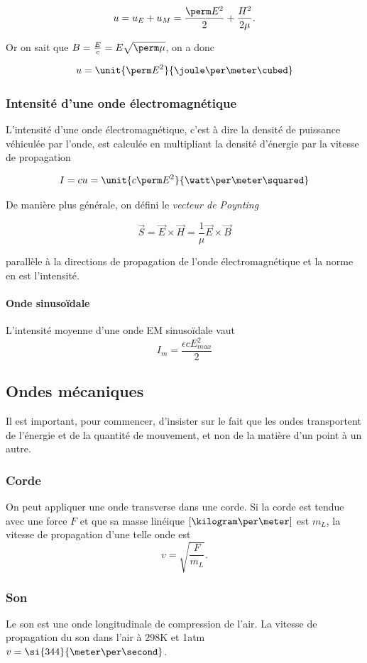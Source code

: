$$u = u_E + u_M = \frac{\perm E^2}{2} + \frac{H^2}{2\mu}.$$

Or on sait que $B = \frac{E}{c} = E\sqrt{\perm\mu}$, on a donc

$$u = \unit{\perm E^2}{\joule\per\meter\cubed}$$

\subsubsection{Intensité d'une onde électromagnétique}
L'intensité d'une onde électromagnétique, c'est à
dire la densité de puissance véhiculée par l'onde, est calculée
en multipliant la densité d'énergie par la vitesse de propagation

$$I = cu = \unit{c\perm E^2}{\watt\per\meter\squared}$$

De manière plus générale, on défini le \emph{vecteur de Poynting}

\[\vec{S} = \vec{E} \times \vec{H} = \frac{1}{\mu} \vec{E} \times \vec{B}\]

parallèle à la directions de propagation de l'onde électromagnétique
et la norme en est l'intensité.

\paragraph{Onde sinusoïdale} L'intensité moyenne d'une onde EM sinusoïdale vaut
\[I_m = \frac{\epsilon c E^2_{max}}{2}\]

\subsection{Ondes mécaniques}
Il est important, pour commencer, d'insister sur le fait
que les ondes transportent de l'énergie et de la quantité de mouvement,
et non de la matière d'un point à un autre.

\subsubsection{Corde}
On peut appliquer une onde transverse dans une corde.
Si la corde est tendue avec une force $F$ et que
sa masse linéique $[\kilogram\per\meter]$ est $m_L$,
la vitesse de propagation d'une telle onde est
\[ v = \sqrt{\frac{F}{m_L}}. \]

\subsubsection{Son}
Le son est une onde longitudinale de compression de l'air.
La vitesse de propagation du son dans l'air à \si{298}{K} et \si{1}{atm}
$v = \si{344}{\meter\per\second}$.

